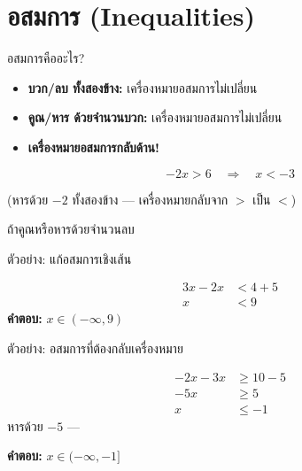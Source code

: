 \documentclass[11pt, aspectratio=169]{beamer}
\begin{document}
\section{อสมการ (Inequalities)}

\begin{frame}{อสมการคืออะไร?}
  \begin{explanation}
    \begin{itemize}
      \item \textbf{บวก/ลบ ทั้งสองข้าง:} เครื่องหมายอสมการไม่เปลี่ยน
      \item \textbf{คูณ/หาร ด้วยจำนวนบวก:} เครื่องหมายอสมการไม่เปลี่ยน
      \item {} \textbf{เครื่องหมายอสมการกลับด้าน!}
    \end{itemize}
  \end{explanation}

  \begin{exambox}
    \[
      -2x > 6 \quad \Rightarrow \quad x < -3
    \]

    (หารด้วย $-2$ ทั้งสองข้าง — เครื่องหมายกลับจาก $>$ เป็น $<$)
  \end{exambox}

  \begin{intuition}
    ถ้าคูณหรือหารด้วยจำนวนลบ 
  \end{intuition}
\end{frame}

\begin{frame}{ตัวอย่าง: แก้อสมการเชิงเส้น}
  \begin{exambox}[โจทย์ 1: $3x - 5 < 2x + 4$]
    \begin{align*}
      3x - 2x &< 4 + 5 \\
      x &< 9
    \end{align*}
    \textbf{คำตอบ:} $x \in (-\infty, 9)$
  \end{exambox}
\end{frame}

\begin{frame}{ตัวอย่าง: อสมการที่ต้องกลับเครื่องหมาย}
  \begin{exambox}
    \begin{align*}
      -2x - 3x &\geq 10 - 5 \\
      -5x &\geq 5 \\
      x &\leq -1
    \end{align*}
    หารด้วย $-5$ — 

    \textbf{คำตอบ:} $x \in (-\infty, -1]$
  \end{exambox}
\end{frame}
\end{document}
